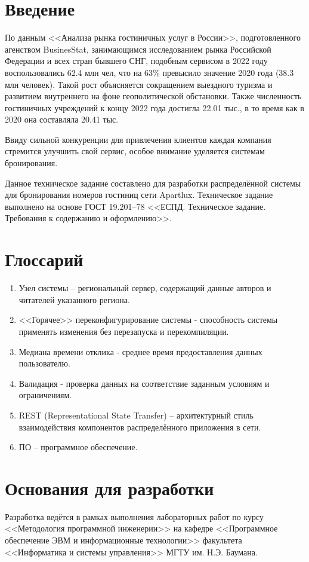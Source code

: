 \section*{Введение}
По данным <<Анализа рынка гостиничных услуг в России>>, подготовленного агенством BusinesStat, занимающимся исследованием рынка Российской Федерации и всех стран бывшего СНГ, подобным сервисом в 2022 году воспользовались 62.4 млн чел, что на 63\% превысило значение 2020 года (38.3 млн человек). Такой рост объясняется сокращением выездного туризма и развитием внутреннего на фоне геополитической обстановки. Также численность гостиничных учреждений к концу 2022 года достигла 22.01 тыс., в то время как в 2020 она составляла 20.41 тыс. 

Ввиду сильной конкуренции для привлечения клиентов каждая компания стремится улучшить свой сервис, особое внимание уделяется системам бронирования.

Данное техническое задание составлено для разработки распределённой системы для  бронирования номеров гостиниц сети Apartlux. Техническое задание выполнено на основе ГОСТ 19.201--78 <<ЕСПД. Техническое задание. Требования к содержанию и оформлению>>.

\section*{Глоссарий}
\begin{enumerate}
	\item Узел системы -- региональный сервер, содержащий данные авторов и читателей указанного региона.
	
	\item <<Горячее>> переконфигурирование системы - способность системы применять изменения без перезапуска и перекомпиляции.
	
	\item Медиана времени отклика - среднее время предоставления данных пользователю.
	
	\item Валидация - проверка данных на соответствие заданным условиям и ограничениям.
	
	\item REST (Representational State Transfer) -- архитектурный стиль взаимодействия компонентов распределённого приложения в сети. 
	
	\item ПО -- программное обеспечение.
\end{enumerate}

\section*{Основания для разработки}
Разработка ведётся в рамках выполнения лабораторных работ по курсу <<Методология программной инженерии>> на кафедре <<Программное обеспечение ЭВМ и информационные технологии>> факультета <<Информатика и системы управления>> МГТУ им. Н.Э. Баумана.

